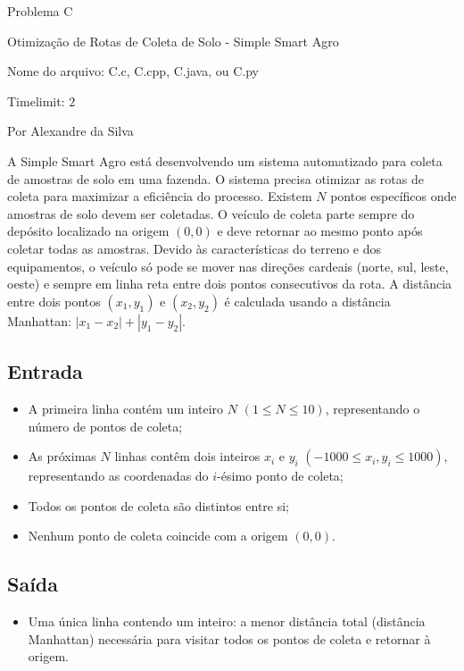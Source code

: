\begin{center}
Problema C

Otimização de Rotas de Coleta de Solo - Simple Smart Agro

{\small Nome do arquivo: C.c, C.cpp, C.java, ou C.py}

{\large Timelimit: $2$}

{\tiny Por Alexandre da Silva}

\end{center}	

\footnotesize
			
A Simple Smart Agro está desenvolvendo um sistema automatizado para coleta de amostras de solo em uma fazenda. O sistema precisa otimizar as rotas de coleta para maximizar a eficiência do processo. Existem $N$ pontos específicos onde amostras de solo devem ser coletadas. O veículo de coleta parte sempre do depósito localizado na origem $(0, 0)$ e deve retornar ao mesmo ponto após coletar todas as amostras. Devido às características do terreno e dos equipamentos, o veículo só pode se mover nas direções cardeais (norte, sul, leste, oeste) e sempre em linha reta entre dois pontos consecutivos da rota. A distância entre dois pontos $(x_1, y_1)$ e $(x_2, y_2)$ é calculada usando a distância Manhattan: $|x_1 - x_2| + |y_1 - y_2|$.

\subsection*{Entrada}

\begin{itemize}
    \item A primeira linha contém um inteiro $N$ $(1 \leq N \leq 10)$, representando o número de pontos de coleta;
    \item As próximas $N$ linhas contêm dois inteiros $x_i$ e $y_i$ $(-1000 \leq x_i, y_i \leq 1000)$, representando as coordenadas do $i$-ésimo ponto de coleta;
       \item Todos os pontos de coleta são distintos entre si;
    \item Nenhum ponto de coleta coincide com a origem $(0,0)$.
\end{itemize}

\subsection*{Saída}

\begin{itemize}
    \item Uma única linha contendo um inteiro: a menor distância total (distância Manhattan) necessária para visitar todos os pontos de coleta e retornar à origem.
\end{itemize}

